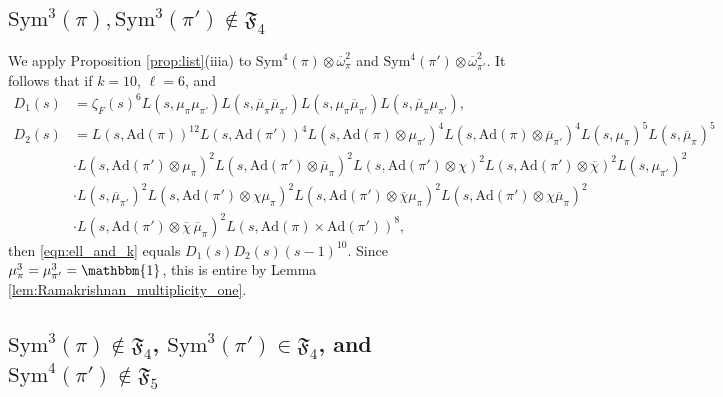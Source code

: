 \documentclass[11pt]{amsart}
\theoremstyle{remark}
\numberwithin{equation}{section}
\begin{document}
\subsection{$\mathrm{Sym}^3(\pi),\mathrm{Sym}^3(\pi')\notin\mathfrak{F}_{4}$}

We apply Proposition \ref{prop:list}(iiia) to $\mathrm{Sym}^4(\pi)\otimes\overline{\omega}_{\pi}^{2}$ and $\mathrm{Sym}^4(\pi')\otimes\overline{\omega}_{\pi'}^{2}$.  It follows that if $k=10$, $\ell=6$, and
\begin{align*}
D_1(s)&= \zeta_F(s)^6 L(s,\mu_{\pi}\mu_{\pi'}) L(s,\overline{\mu}_{\pi}\overline{\mu}_{\pi'})L(s,\mu_{\pi}\overline{\mu}_{\pi'}) L(s,\overline{\mu}_{\pi}\mu_{\pi'}),\\
D_2(s)&= L(s,\mathrm{Ad}(\pi))^{12} L(s,\mathrm{Ad}(\pi'))^4 L(s,\mathrm{Ad}(\pi)\otimes\mu_{\pi'})^4 L(s,\mathrm{Ad}(\pi)\otimes\overline{\mu}_{\pi'})^4 L(s,\mu_{\pi})^5 L(s,\overline{\mu}_{\pi})^5\\
&\cdot  L(s,\mathrm{Ad}(\pi')\otimes\mu_{\pi})^2 L(s,\mathrm{Ad}(\pi')\otimes\overline{\mu}_{\pi})^2 L(s,\mathrm{Ad}(\pi')\otimes\chi)^2  L(s,\mathrm{Ad}(\pi')\otimes\overline{\chi})^2 L(s,\mu_{\pi'})^2 \\
&\cdot L(s,\overline{\mu}_{\pi'})^2 L(s,\mathrm{Ad}(\pi')\otimes\chi\mu_{\pi})^2 L(s,\mathrm{Ad}(\pi')\otimes\overline{\chi}\mu_{\pi})^2 L(s,\mathrm{Ad}(\pi')\otimes\chi\overline{\mu}_{\pi})^2 \\
&\cdot L(s,\mathrm{Ad}(\pi')\otimes\overline{\chi}\,\overline{\mu}_{\pi})^2 L(s,\mathrm{Ad}(\pi)\times\mathrm{Ad}(\pi'))^8, 
\end{align*}
then \eqref{eqn:ell_and_k} equals $D_1(s) D_2(s) (s-1)^{10}$.  Since $\mu_{\pi}^3=\mu_{\pi'}^3=\mathbbm{1}$, this is entire by Lemma \ref{lem:Ramakrishnan_multiplicity_one}.

\subsection{$\mathrm{Sym}^3(\pi)\notin\mathfrak{F}_{4}$, $\mathrm{Sym}^3(\pi')\in\mathfrak{F}_{4}$, and $\mathrm{Sym}^4(\pi')\notin\mathfrak{F}_{5}$}

\end{document}
